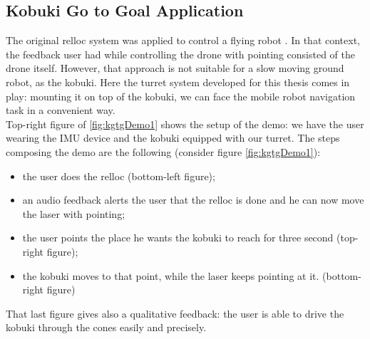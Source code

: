 \subsection{Kobuki Go to Goal Application}
The original relloc system was applied to control a flying robot \cite{gromov2018robot}. In that context, the feedback user had while controlling the drone with pointing consisted of the drone itself. However, that approach is not suitable for a slow moving ground robot, as the kobuki. Here the turret system developed for this thesis comes in play: mounting it on top of the kobuki, we can face the mobile robot navigation task in a convenient way.\\
Top-right figure of \ref{fig:kgtgDemo1} shows the setup of the demo: we have the user wearing the IMU device and the kobuki equipped with our turret. The steps composing the demo are the following (consider figure \ref{fig:kgtgDemo1}):
\begin{itemize}
    \item the user does the relloc (bottom-left figure);
    \item an audio feedback alerts the user that the relloc is done and he can now move the laser with pointing;
    \item the user points the place he wants the kobuki to reach for three second (top-right figure);
    \item the kobuki moves to that point, while the laser keeps pointing at it. (bottom-right figure)
\end{itemize}
That last figure gives also a qualitative feedback: the user is able to drive the kobuki through the cones easily and precisely.
